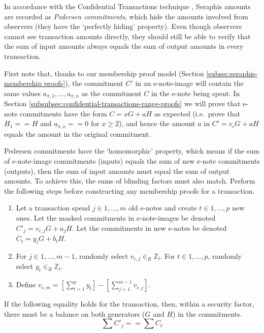 In accordance with the Confidential Transactions technique \cite{maxwell-ct-2}, Seraphis amounts are recorded as {\em Pedersen commitments}, which hide the amounts involved from observers (they have the `perfectly hiding' property). Even though observers cannot see transaction amounts directly, they should still be able to verify that the sum of input amounts always equals the sum of output amounts in every transaction.

First note that, thanks to our membership proof model (Section \ref{subsec:seraphis-membership proofs}), the commitment $C'$ in an e-note-image will contain the same values $a_{\pi,1},...,a_{\pi,n}$ as the commitment $C$ in the e-note being spent. In Section \ref{subsubsec:confidential-transactions-range-proofs} we will prove that e-note commitments have the form $C = x G + a H$ as expected (i.e.\ prove that $H_1 == H$ and $a_{\pi,x} == 0$ for $x \geq 2$), and hence the amount $a$ in $C' = v_c G + a H$ equals the amount in the original commitment.

Pedersen commitments have the `homomorphic' property, which means if the sum of e-note-image commitments (inputs) equals the sum of new e-note commitments (outputs), then the sum of input amounts must equal the sum of output amounts. To achieve this, the sums of blinding factors must also match. Perform the following steps before constructing any membership proofs for a transaction.

\begin{enumerate}
    \item Let a transaction spend $j \in 1,...,m$ old e-notes and create $t \in 1,...,p$ new ones. Let the masked commitments in e-note-images be denoted $C'_j = v_{c,j} G + a_j H$. Let the commitments in new e-notes be denoted $C_t = y_t G + b_t H$.

    \item For $j \in 1,...,m-1$, randomly select $v_{c,j} \in_R \mathbb{Z}_l$. For $t \in 1,...,p$, randomly select $y_t \in_R \mathbb{Z}_l$.

    \item Define $v_{c,m} = [\sum^{p}_{t=1} y_t] - [\sum^{m-1}_{j=1} v_{c,j}]$.
\end{enumerate}

If the following equality holds for the transaction, then, within a security factor, there must be a balance on both generators ($G$ and $H$) in the commitments.\vspace{.115cm}
\[\sum C'_j == \sum C_t\]

